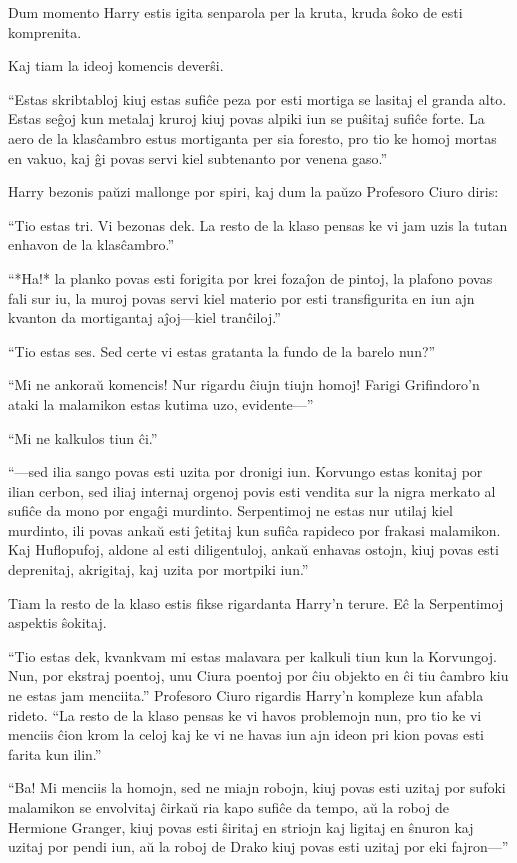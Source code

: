 Dum momento Harry estis igita senparola per la kruta, kruda ŝoko de
esti komprenita.

Kaj tiam la ideoj komencis deverŝi.

``Estas skribtabloj kiuj estas sufiĉe peza por esti mortiga se lasitaj
el granda alto. Estas seĝoj kun metalaj kruroj kiuj povas alpiki iun
se puŝitaj sufiĉe forte. La aero de la klasĉambro estus mortiganta per
sia foresto, pro tio ke homoj mortas en vakuo, kaj ĝi povas servi kiel
subtenanto por venena gaso.''

Harry bezonis paŭzi mallonge por spiri, kaj dum la paŭzo Profesoro Ciuro diris:

``Tio estas tri. Vi bezonas dek. La resto de la klaso pensas ke vi jam
uzis la tutan enhavon de la klasĉambro.''

``*Ha!* la planko povas esti forigita por krei fozaĵon de pintoj, la
plafono povas fali sur iu, la muroj povas servi kiel materio por esti
transfigurita en iun ajn kvanton da mortigantaj aĵoj—kiel tranĉiloj.''

``Tio estas ses. Sed certe vi estas gratanta la fundo de la barelo nun?''

``Mi ne ankoraŭ komencis! Nur rigardu ĉiujn tiujn homoj! Farigi
Grifindoro'n ataki la malamikon estas kutima uzo, evidente—''

``Mi ne kalkulos tiun ĉi.''

``—sed ilia sango povas esti uzita por dronigi iun. Korvungo estas
konitaj por ilian cerbon, sed iliaj internaj orgenoj povis esti
vendita sur la nigra merkato al sufiĉe da mono por engaĝi
murdinto. Serpentimoj ne estas nur utilaj kiel murdinto, ili povas
ankaŭ esti ĵetitaj kun sufiĉa rapideco por frakasi malamikon. Kaj
Huflopufoj, aldone al esti diligentuloj, ankaŭ enhavas ostojn, kiuj
povas esti deprenitaj, akrigitaj, kaj uzita por mortpiki iun.''

Tiam la resto de la klaso estis fikse rigardanta Harry'n terure. Eĉ la
Serpentimoj aspektis ŝokitaj.

``Tio estas dek, kvankvam mi estas malavara per kalkuli tiun kun la
Korvungoj. Nun, por ekstraj poentoj, unu Ciura poentoj por ĉiu objekto
en ĉi tiu ĉambro kiu ne estas jam menciita.'' Profesoro Ciuro rigardis
Harry'n kompleze kun afabla rideto. ``La resto de la klaso pensas ke
vi havos problemojn nun, pro tio ke vi menciis ĉion krom la celoj kaj
ke vi ne havas iun ajn ideon pri kion povas esti farita kun ilin.''

``Ba! Mi menciis la homojn, sed ne miajn robojn, kiuj povas esti uzitaj
por sufoki malamikon se envolvitaj ĉirkaŭ ria kapo sufiĉe da tempo, aŭ
la roboj de Hermione Granger, kiuj povas esti ŝiritaj en striojn kaj
ligitaj en ŝnuron kaj uzitaj por pendi iun, aŭ la roboj de Drako kiuj
povas esti uzitaj por eki fajron—''

